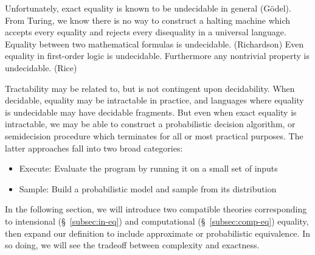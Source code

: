 \documentclass[11pt]{article}
\begin{document}
    Unfortunately, exact equality is known to be undecidable in general (G\"odel). From Turing, we know there is no way to construct a halting machine which accepts every equality and rejects every disequality in a universal language. Equality between two mathematical formulas is undecidable. (Richardson) Even equality in first-order logic is undecidable. Furthermore any nontrivial property is undecidable. (Rice)


    Tractability may be related to, but is not contingent upon decidability. When decidable, equality may be intractable in practice, and languages where equality is undecidable may have decidable fragments. But even when exact equality is intractable, we may be able to construct a probabilistic decision algorithm, or semidecision procedure which terminates for all or most practical purposes. The latter approaches fall into two broad categories:

    \begin{itemize}
        \item Execute: Evaluate the program by running it on a small set of inputs
        \item Sample: Build a probabilistic model and sample from its distribution
    \end{itemize}

    In the following section, we will introduce two compatible theories corresponding to intensional (\S~\ref{subsec:in-eq}) and computational (\S~\ref{subsec:comp-eq}) equality, then expand our definition to include approximate or probabilistic equivalence. In so doing, we will see the tradeoff between complexity and exactness.

%


\end{document}
